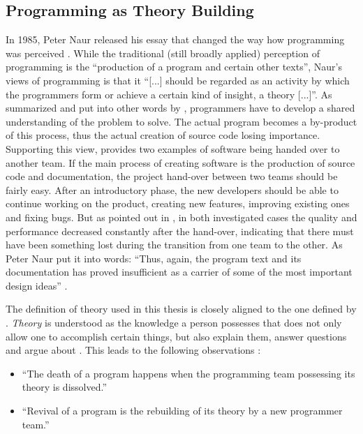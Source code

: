 \subsection{Programming as Theory Building}
\label{sub:programming-as-theory-building}
In 1985, Peter Naur released his essay  that changed the way how programming was perceived \autocite{naur_programming_1985}.
While the traditional (still broadly applied) perception of programming is the ``production of a program and certain other texts'', Naur's views of programming is that it ``[...] should be regarded as an activity by which the programmers form or achieve a certain kind of insight, a theory [...]''.
As summarized and put into other words by \textcite{aranda_naurs_2011}, programmers have to develop a shared understanding of the problem to solve.
The actual program becomes a by-product of this process, thus the actual creation of source code losing importance.
Supporting this view, \citeauthor{naur_programming_1985} provides two examples of software being handed over to another team.
If the main process of creating software is the production of source code and documentation, the project hand-over between two teams should be fairly easy.
After an introductory phase, the new developers should be able to continue working on the product, creating new features, improving existing ones and fixing bugs.
But as pointed out in \textcite[228--229]{naur_programming_1985}, in both investigated cases the quality and performance decreased constantly after the hand-over, indicating that there must have been something lost during the transition from one team to the other.
As Peter Naur put it into words: ``Thus, again, the program text and its documentation has proved insufficient as a carrier of some of the most important design ideas'' \autocite[229]{naur_programming_1985}.

The definition of theory used in this thesis is closely aligned to the one defined by \textcite{ryle_concept_1984}.
\emph{Theory} is understood as the knowledge a person possesses that does not only allow one to accomplish certain things, but also explain them, answer questions and argue about \autocite{naur_programming_1985}.
This leads to the following observations \autocite[234]{naur_programming_1985}:
\begin{itemize}
    \item ``The death of a program happens when the programming team possessing its theory is dissolved.''
    \item ``Revival of a program is the rebuilding of its theory by a new programmer team.''
\end{itemize}

